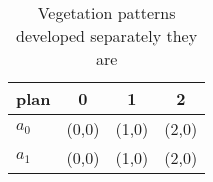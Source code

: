 \documentclass[a4paper]{article}
\begin{document}
\begin{table}
\begin{adjustbox}{width=0.5\columnwidth}
\begin{tabular}{|l|l|l|l|}
\hline
\textbf{plan} & \multicolumn{1}{c|}{\textbf{0}} & \multicolumn{1}{c|}{\textbf{1}} & \multicolumn{1}{c|}{\textbf{2}} \\ \hline
\textbf{$a_0$}  & (0,0) & (1,0) & (2,0) \\ \hline
\textbf{$a_1$}  & (0,0) & (1,0) & (2,0) \\ \hline
\end{tabular}
\end{adjustbox}
\caption{Vegetation patterns developed separately they are
}
\end{table}
\end{document}

